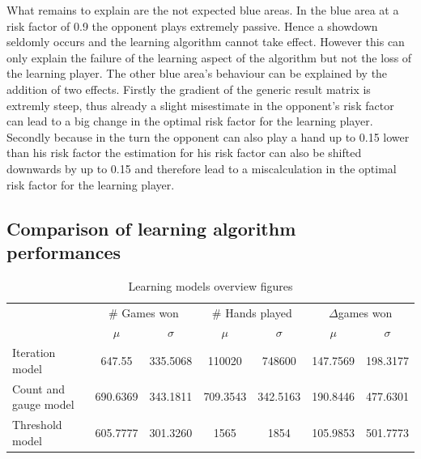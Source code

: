 \documentclass[11pt]{article}
\begin{document}
What remains to explain are the not expected blue areas. In the blue area at a risk factor of 0.9 the opponent plays extremely passive. Hence a showdown seldomly occurs and the learning algorithm cannot take effect. However this can only explain the failure of the learning aspect of the algorithm but not the loss of the learning player. The other blue area's behaviour can be explained by the addition of two effects. Firstly the gradient of the generic result matrix is extremly steep, thus already a slight misestimate in the opponent's risk factor can lead to a big change in the optimal risk factor for the learning player. Secondly because in the turn the opponent can also play a hand up to 0.15 lower than his risk factor the estimation for his risk factor can also be shifted downwards by up to 0.15 and therefore lead to a miscalculation in the optimal risk factor for the learning player.


\subsection{Comparison of learning algorithm performances}


\begin{table}[]
\centering
\caption{Learning models overview figures}


\label{Learning models overview}
\begin{tabular}{lcccccc}
\cline{2-7}
                                           & \multicolumn{2}{c}{\# Games won}                      & \multicolumn{2}{c}{\# Hands played}                   & \multicolumn{2}{c}{$\Delta$games won} \\ \cline{2-7} 
\multicolumn{1}{c|}{}                       & \multicolumn{1}{c|}{$\mu$} & \multicolumn{1}{c|}{$\sigma$} & \multicolumn{1}{c|}{$\mu$} & \multicolumn{1}{c|}{$\sigma$} & \multicolumn{1}{c|}{$\mu$} & $\sigma$ \\ \hline


\multicolumn{1}{l|}{Iteration model}           & 647.55                     & \multicolumn{1}{c|}{335.5068}         & 110020                     & \multicolumn{1}{c|}{748600}   & 147.7569                            & 198.3177        \\ \hline
\multicolumn{1}{l|}{Count and gauge model} & 690.6369                   & \multicolumn{1}{c|}{343.1811} & 709.3543                   & \multicolumn{1}{c|}{342.5163} & 190.8446                   & 477.6301 \\ \hline
\multicolumn{1}{l|}{Threshold model}       & 605.7777                   & \multicolumn{1}{c|}{301.3260} & 1565                       & \multicolumn{1}{c|}{1854}     & 105.9853                   & 501.7773 \\ \hline


\end{tabular}
\end{table}
\end{document}
